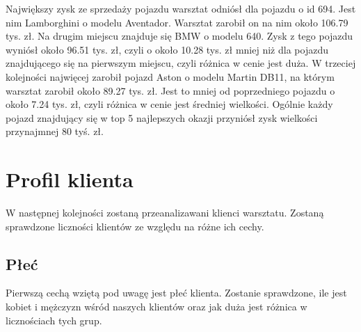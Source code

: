 \documentclass{article}\usepackage[]{graphicx}\usepackage[]{xcolor}
\begin{document}
Największy zysk ze sprzedaży pojazdu warsztat odniósł dla pojazdu o id 694. Jest nim Lamborghini o modelu Aventador. Warsztat zarobił on na nim około 106.79 tys. zł. 
Na drugim miejscu znajduje się BMW o modelu 640. Zysk z tego pojazdu wyniósł około 96.51 tys. zł, czyli o około 10.28 tys. zł mniej niż dla pojazdu znajdującego się na pierwszym miejscu, czyli różnica w cenie jest duża.
W trzeciej kolejności najwięcej zarobił pojazd Aston o modelu Martin DB11, na którym warsztat zarobił około 89.27 tys. zł. Jest to mniej od poprzedniego pojazdu o około 7.24 tys. zł, czyli różnica w cenie jest średniej wielkości. 
Ogólnie każdy pojazd znajdujący się w top 5 najlepszych okazji przyniósł zysk wielkości przynajmnej 80 tyś. zł.

\section{Profil klienta}

W następnej kolejności zostaną przeanalizawani klienci warsztatu. Zostaną sprawdzone liczności klientów ze względu na różne ich cechy.

\subsection{Płeć}

Pierwszą cechą wziętą pod uwagę jest płeć klienta. Zostanie sprawdzone, ile jest kobiet i mężczyzn wśród naszych klientów oraz jak duża jest różnica w licznościach tych grup.
\end{document}
